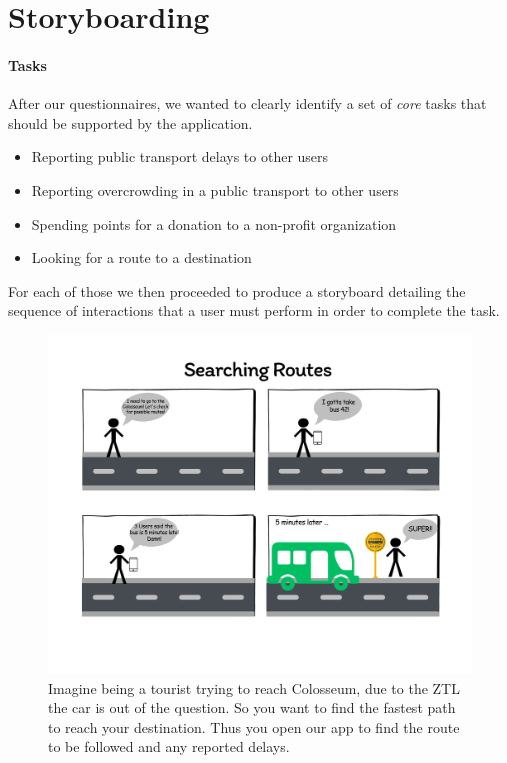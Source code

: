 \documentclass[a4paper, 11pt]{report}
\newenvironment{titlebox}[1][]{%
  \centering
  \basecolorbox[#1]%
}{%
  \endbasecolorbox%
}
\begin{document}
\section{Storyboarding}\label{sec:storyboarding}

\paragraph{Tasks}

After our questionnaires, we wanted to clearly identify a set of \emph{core} tasks that should be
supported by the application.

\begin{titlebox}[The Tasks:]
	\begin{itemize}\label{list:tasks}
		\item Reporting public transport delays to other users
		\item Reporting overcrowding in a public transport to other users
		\item Spending points for a donation to a non-profit organization
		\item Looking for a route to a destination
	\end{itemize}
\end{titlebox}


For each of those we then proceeded to produce a storyboard detailing the sequence of
interactions that a user must perform in order to complete the task.


\begin{figure}[H]
	\centering	
	\includegraphics[width=.5\textwidth]{img/storyboards/storyboard_searching_routes.png}
	\caption{Imagine being a tourist trying to reach Colosseum,
	due to the ZTL the car is out of the question. So you want to find the fastest
	 path to reach your destination. Thus you open our app to find the route to be followed and any reported delays.}
	\label{fig:a}
\end{figure}	
\end{document}
